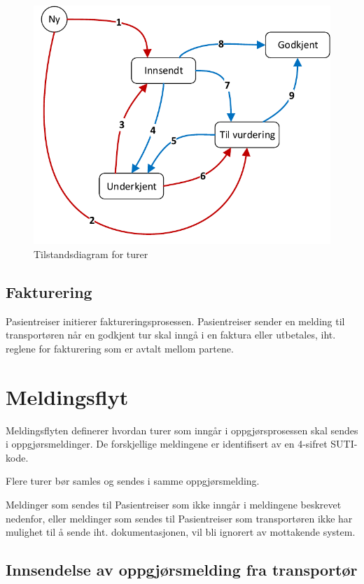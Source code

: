 \documentclass[a4paper,titlepage,norsk,11pt]{article}
\begin{document}
\begin{figure}[H]
	\centering
	\includegraphics[scale=0.9]{tilstandsdiagram}
  \caption{Tilstandsdiagram for turer}
  \label{sec:tilstandsdiagram}
\end{figure}

\subsection{Fakturering}
Pasientreiser initierer faktureringsprosessen. Pasientreiser sender en melding til transportøren når en godkjent tur skal inngå i en faktura eller utbetales, iht. reglene for fakturering som er avtalt mellom partene.

\section{Meldingsflyt}
\label{sec:Meldingsflyt}

Meldingsflyten definerer hvordan turer som inngår i oppgjørsprosessen skal sendes i oppgjørsmeldinger. De forskjellige meldingene er identifisert av en 4-sifret SUTI-kode.

Flere turer bør samles og sendes i samme oppgjørsmelding.

Meldinger som sendes til Pasientreiser som ikke inngår i meldingene beskrevet nedenfor, eller meldinger som sendes til Pasientreiser som transportøren ikke har mulighet til å sende iht. dokumentasjonen, vil bli ignorert av mottakende system.

\subsection{Innsendelse av oppgjørsmelding fra transportør}
\end{document}

